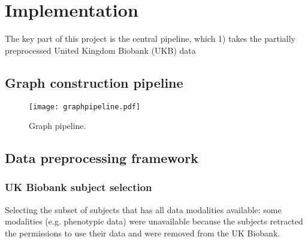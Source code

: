 \chapter{Implementation}



The key part of this project is the central pipeline, which 1) takes the partially preprocessed United Kingdom Biobank (UKB) data

\section{Graph construction pipeline}


\begin{figure}[!ht]
    \texttt{[image: graphpipeline.pdf]}
    \label{graphpipeline}
    \caption{Graph pipeline.}
\end{figure}

\section{Data preprocessing framework}
\subsection{UK Biobank subject selection}
Selecting the subset of subjects that has all data modalities available: some modalities (e.g. phenotypic data) were unavailable because the subjects retracted the permissions to use their data and were removed from the UK Biobank.


